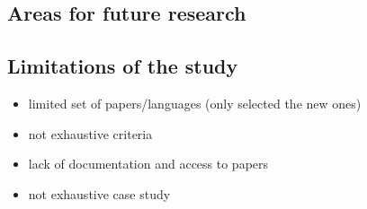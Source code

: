 \subsection{Areas for future research}


\subsection{Limitations of the study}\label{subsec:limitations-of-the-study}
\begin{itemize}
    \item limited set of papers/languages (only selected the new ones)
    \item not exhaustive criteria
    \item lack of documentation and access to papers
    \item not exhaustive case study
\end{itemize}



